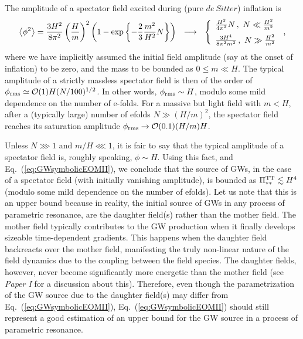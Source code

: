 \documentclass[a4paper,11pt]{article}
\begin{document}
The amplitude of a spectator field excited during (pure $de~Sitter$) inflation is~\cite{Linde:2005ht}
\begin{eqnarray}
\left\langle \phi^2 \right\rangle = {3H^2\over 8\pi^2}\left({H\over m}\right)^2\left(1-\exp\left\lbrace -{2\over3}{m^2\over H^2}N\right\rbrace\right)~~\longrightarrow~~\left\lbrace \begin{array}{l}
{H^2\over 4\pi^2}N\,,~N \ll {H^2\over m^2}\vspace*{0.2cm}\\
{3H^4\over 8\pi^2m^2}\,,~N \gg {H^2\over m^2}
\end{array}\right.\,,
\end{eqnarray}
where we have implicitly assumed the initial field amplitude (say at the onset of inflation) to be zero, and the mass to be bounded as $0 \leq m \ll H$. The typical amplitude of a strictly massless spectator field is then of the order of $\phi_{\rm rms} \simeq \mathcal{O}(1)H(N/100)^{1/2}$. In other words, $\phi_{\rm rms} \sim H$, modulo some mild dependence on the number of e-folds. For a massive but light field with $m < H$, after a (typically large) number of efolds $N \gg (H/m)^2$, the spectator field reaches its saturation amplitude $\phi_{\rm rms} \rightarrow \mathcal{O}(0.1) (H/m) H$. 

Unless $N \ggg 1$ and $m/H \lll 1$, it is fair to say that the typical amplitude of a spectator field is, roughly speaking, $\phi \sim H$. Using this fact, and Eq.~(\ref{eq:GWsymbolicEOMII}), we conclude that the source of GWs, in the case of a spectator field (with initially vanishing amplitude), is bounded as $\Pi_{**}^{\rm TT} \lesssim H^4$ (modulo some mild dependence on the number of efolds). Let us note that this is an upper bound because in reality, the initial source of GWs in any process of parametric resonance, are the daughter field(s) rather than the mother field. The mother field typically contributes to the GW production when it finally develops sizeable time-dependent gradients. This happens when the daughter field backreacts over the mother field, manifesting the truly non-linear nature of the field dynamics due to the coupling between the field species. The daughter fields, however, never become significantly more energetic than the mother field (see {\it Paper I} for a discussion about this). Therefore, even though the parametrization of the GW source due to the daughter field(s) may differ from Eq.~(\ref{eq:GWsymbolicEOMII}), Eq.~(\ref{eq:GWsymbolicEOMII}) should still represent a good estimation of an upper bound for the GW source in a process of parametric resonance. 
\end{document}
